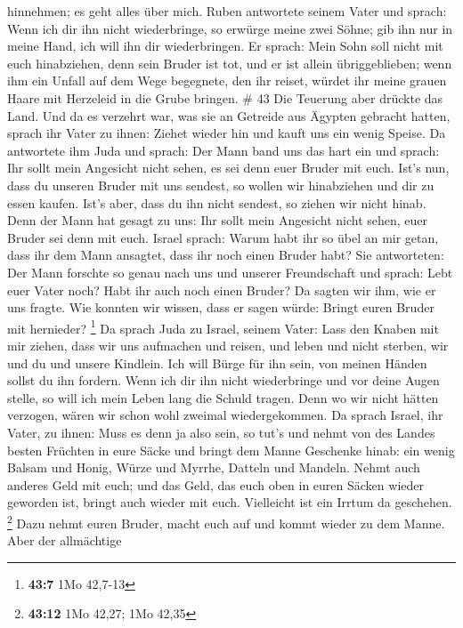 hinnehmen; es geht alles über mich.  Ruben antwortete
seinem Vater und sprach: Wenn ich dir ihn nicht wiederbringe, so erwürge
meine zwei Söhne; gib ihn nur in meine Hand, ich will ihn dir
wiederbringen.  Er sprach: Mein Sohn soll nicht mit euch
hinabziehen, denn sein Bruder ist tot, und er ist allein übriggeblieben;
wenn ihm ein Unfall auf dem Wege begegnete, den ihr reiset, würdet ihr
meine grauen Haare mit Herzeleid in die Grube bringen. \# 43
 Die Teuerung aber drückte das Land.  Und da es
verzehrt war, was sie an Getreide aus Ägypten gebracht hatten, sprach
ihr Vater zu ihnen: Ziehet wieder hin und kauft uns ein wenig Speise.
 Da antwortete ihm Juda und sprach: Der Mann band uns das
hart ein und sprach: Ihr sollt mein Angesicht nicht sehen, es sei denn
euer Bruder mit euch.  Ist's nun, dass du unseren Bruder mit
uns sendest, so wollen wir hinabziehen und dir zu essen kaufen.
 Ist's aber, dass du ihn nicht sendest, so ziehen wir nicht
hinab. Denn der Mann hat gesagt zu uns: Ihr sollt mein Angesicht nicht
sehen, euer Bruder sei denn mit euch.  Israel sprach: Warum
habt ihr so übel an mir getan, dass ihr dem Mann ansagtet, dass ihr noch
einen Bruder habt?  Sie antworteten: Der Mann forschte so
genau nach uns und unserer Freundschaft und sprach: Lebt euer Vater
noch? Habt ihr auch noch einen Bruder? Da sagten wir ihm, wie er uns
fragte. Wie konnten wir wissen, dass er sagen würde: Bringt euren Bruder
mit hernieder? \footnote{\textbf{43:7} 1Mo 42,7-13}  Da
sprach Juda zu Israel, seinem Vater: Lass den Knaben mit mir ziehen,
dass wir uns aufmachen und reisen, und leben und nicht sterben, wir und
du und unsere Kindlein.  Ich will Bürge für ihn sein, von
meinen Händen sollst du ihn fordern. Wenn ich dir ihn nicht wiederbringe
und vor deine Augen stelle, so will ich mein Leben lang die Schuld
tragen.  Denn wo wir nicht hätten verzogen, wären wir schon
wohl zweimal wiedergekommen.  Da sprach Israel, ihr Vater,
zu ihnen: Muss es denn ja also sein, so tut's und nehmt von des Landes
besten Früchten in eure Säcke und bringt dem Manne Geschenke hinab: ein
wenig Balsam und Honig, Würze und Myrrhe, Datteln und Mandeln.
 Nehmt auch anderes Geld mit euch; und das Geld, das euch
oben in euren Säcken wieder geworden ist, bringt auch wieder mit euch.
Vielleicht ist ein Irrtum da geschehen. \footnote{\textbf{43:12} 1Mo
  42,27; 1Mo 42,35}  Dazu nehmt euren Bruder, macht euch
auf und kommt wieder zu dem Manne.  Aber der allmächtige
